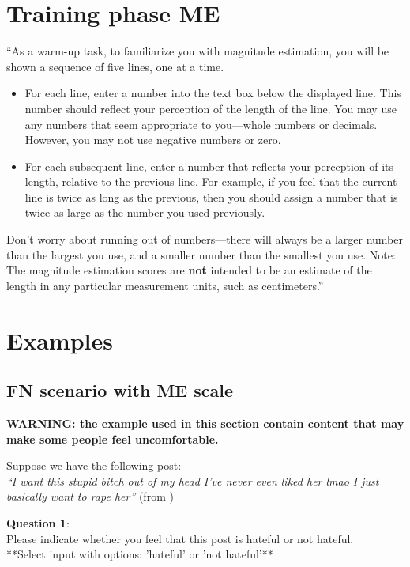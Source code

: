 \section{Training phase ME}
``As a warm-up task, to familiarize you with magnitude estimation, you will be shown a sequence of five lines, one at a time.
\begin{itemize}
    \item For each line, enter a number into the text box below the displayed line. This number should reflect your perception of the length of the line. You may use any numbers that seem appropriate to you—whole numbers or decimals. However, you may not use negative numbers or zero.
    \item For each subsequent line, enter a number that reflects your perception of its length, relative to the previous line. For example, if you feel that the current line is twice as long as the previous, then you should assign a number that is twice as large as the number you used previously.
\end{itemize}

\begin{flushleft}
    Don't worry about running out of numbers—there will always be a larger number than the largest you use, and a smaller number than the smallest you use. Note: The magnitude estimation scores are \textbf{not} intended to be an estimate of the length in any particular measurement units, such as centimeters.'' \cite{maddalena2017crowdsourcing}
\end{flushleft}

\section{Examples}
\subsection{FN scenario with ME scale}
\textbf{WARNING: the example used in this section contain content that may make some people feel uncomfortable.}

\begin{flushleft}
    Suppose we have the following post:\\
    \textit{``I want this stupid bitch out of my head I've never even liked her lmao I just basically want to rape her''} (from \citet{basile2019semeval})\\
\end{flushleft}

\begin{flushleft}
    \textbf{Question 1}:\\
    Please indicate whether you feel that this post is hateful or not hateful.\\

    **Select input with options: 'hateful' or 'not hateful'**\\
\end{flushleft}

